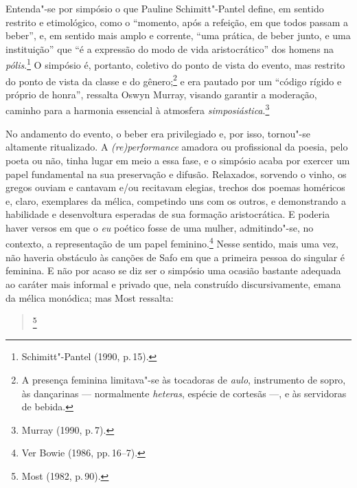 Entenda"-se por simpósio o que Pauline Schimitt"-Pantel define, em
sentido restrito e etimológico, como o “momento, após a refeição, em que todos
passam a beber”, e, em sentido mais amplo e corrente, “uma prática, de beber
junto, e uma instituição” que “é a expressão do modo de vida aristocrático” dos
homens na \emph{pólis}.\footnote{ Schimitt"-Pantel (1990, p.\,15).} O simpósio
é, portanto, coletivo do ponto de vista do
evento, mas restrito do ponto de vista da classe e do gênero;\footnote{A presença
feminina limitava"-se às tocadoras de \emph{aulo}, instrumento de sopro, às
dançarinas --- normalmente \emph{heteras}, espécie de cortesãs ---, e às servidoras de bebida.} e era pautado por um
“código rígido e próprio de honra”, ressalta Oswyn Murray, visando
garantir a moderação, caminho para a harmonia essencial à atmosfera
\emph{simposiástica}.\footnote{ Murray (1990, p.\,7).}

No andamento do evento, o beber era privilegiado e, por isso, tornou"-se
altamente ritualizado. A \emph{(re)performance} amadora ou profissional da
poesia, pelo poeta ou não, tinha lugar em meio a essa fase, e o simpósio acaba
por exercer um papel fundamental na sua preservação e difusão. Relaxados,
sorvendo o vinho, os gregos ouviam e cantavam e/ou recitavam elegias, trechos
dos poemas homéricos e, claro, exemplares da mélica, competindo uns com os
outros, e demonstrando a habilidade e desenvoltura esperadas de sua formação
aristocrática. E poderia haver
versos em que o \emph{eu} poético fosse de uma mulher, admitindo"-se, no contexto, a
representação de um papel feminino.\footnote{ Ver Bowie (1986, pp.\,16--7).}
Nesse sentido, mais uma vez, não haveria obstáculo às canções de Safo em que a primeira pessoa do singular é feminina. E não por acaso se diz ser o simpósio uma
ocasião bastante adequada ao caráter mais informal e privado que, nela construído discursivamente, emana da mélica monódica; mas Most ressalta:

\begin{quote}
\footnote{ Most (1982, p.\,90).}
\end{quote}

